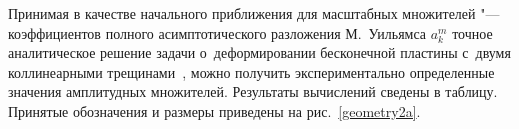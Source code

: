 %
%



\smallskip

Принимая в качестве начального приближения для масштабных множителей "--- коэффициентов полного асимптотического разложения М.~Уильямса $a^m_k$ точное аналитическое решение задачи о~деформировании бесконечной пластины с~двумя коллинеарными трещинами~\cite{Stepanova2016}, можно получить экспериментально определенные значения амплитудных множителей. 
Результаты вычислений сведены в таблицу. Принятые обозначения и размеры приведены на рис.~\ref{geometry2a}.



